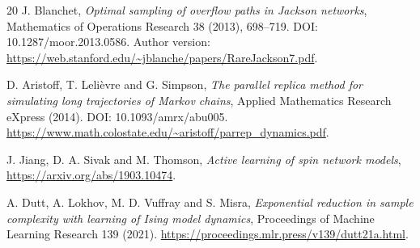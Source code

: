 \documentclass[10pt,a4paper]{article}
\begin{document}
\begin{thebibliography}{20}
J. Blanchet, \emph{Optimal sampling of overflow paths in Jackson
networks}, Mathematics of Operations Research
38 (2013), 698--719. DOI: 10.1287/moor.2013.0586.
Author version: \url{https://web.stanford.edu/~jblanche/papers/RareJackson7.pdf}.

D. Aristoff, T. Leli\`evre and G. Simpson,
\emph{The parallel replica method for simulating long trajectories of
Markov chains}, Applied Mathematics Research eXpress (2014).
DOI: 10.1093/amrx/abu005.
\url{https://www.math.colostate.edu/~aristoff/parrep_dynamics.pdf}.

J. Jiang, D. A. Sivak and M. Thomson,
\emph{Active learning of spin network models},
\url{https://arxiv.org/abs/1903.10474}.

A. Dutt, A. Lokhov, M. D. Vuffray and S. Misra,
\emph{Exponential reduction in sample complexity with learning of Ising
model dynamics},
Proceedings of Machine Learning Research 139 (2021).
\url{https://proceedings.mlr.press/v139/dutt21a.html}.
\end{thebibliography}
\end{document}
